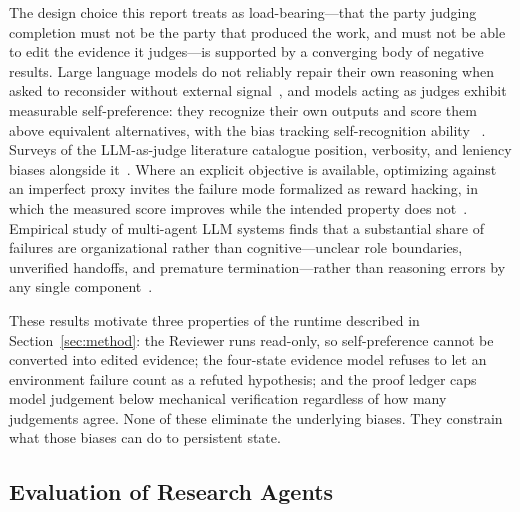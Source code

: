 The design choice this report treats as load-bearing---that the party judging
completion must not be the party that produced the work, and must not be able to edit
the evidence it judges---is supported by a converging body of negative results. Large
language models do not reliably repair their own reasoning when asked to reconsider
without external signal~\citep{huang2024selfcorrect}, and models acting as judges
exhibit measurable self-preference: they recognize their own outputs and score them
above equivalent alternatives, with the bias tracking self-recognition ability
~\citep{panickssery2024selfrecognition,wataoka2024selfpreference}. Surveys of the
LLM-as-judge literature catalogue position, verbosity, and leniency biases alongside
it~\citep{gu2024judgesurvey}. Where an explicit objective is
available, optimizing against an imperfect proxy invites the failure mode formalized
as reward hacking, in which the measured score improves while the intended property
does not~\citep{skalse2022rewardhacking}. Empirical study of multi-agent LLM systems
finds that a substantial share of failures are organizational rather than
cognitive---unclear role boundaries, unverified handoffs, and premature
termination---rather than reasoning errors by any single
component~\citep{cemri2025multiagentfail}.

These results motivate three properties of the runtime described in
Section~\ref{sec:method}: the Reviewer runs read-only, so self-preference cannot be
converted into edited evidence; the four-state evidence model refuses to let an
environment failure count as a refuted hypothesis; and the proof ledger caps
model judgement below mechanical verification regardless of how many judgements
agree. None of these eliminate the underlying biases. They constrain what those
biases can do to persistent state.

\subsection{Evaluation of Research Agents}

